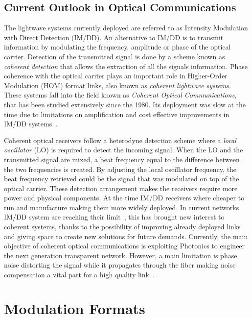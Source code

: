 \subsection{Current Outlook in Optical Communications}


The lightwave systems currently deployed are referred to as Intensity Modulation with Direct Detection (IM/DD). An alternative to IM/DD is to transmit information by modulating the frequency, amplitude or  phase of the optical carrier. Detection of the transmitted signal is done by a scheme known as \textit{coherent detection} that allows the extraction of all the signals information. Phase coherence with the optical carrier plays an important role in Higher-Order Modulation (HOM) format links, also known as \textit{coherent lightwave systems}. These systems fall into the field known as  \textit{Coherent Optical Communications}, that has been studied extensively since the 1980. Its deployment was slow at the time due to limitations on amplification and cost effective improvements in IM/DD systems~\cite{FiberAgrawal,NetGenTransp}.

 Coherent optical receivers follow a heterodyne detection scheme where a \textit{local oscillator} (LO) is required to detect the incoming signal.
When the LO and the transmitted signal are mixed, a beat frequency equal to the difference between the two frequencies is created. By adjusting the local oscillator frequency, the beat frequency retrieved could be the signal that was modulated on top of the optical carrier. These detection arrangement makes the receivers require more power and physical components. At the time IM/DD receivers where cheaper to run and manufacture making them more widely deployed. In current networks IM/DD system are reaching their limit~\cite{COChistory}, this has brought new interest to coherent systems, thanks to the possibility of improving already deployed links and giving space to create new solutions for future demands. Currently, the main objective of coherent optical communications is exploiting Photonics to engineer the next generation transparent network. However, a main limitation is phase noise distorting the signal while it propagates through the fiber making noise compensation a vital part for a high quality link~\cite{behrens2010nonlinear}.

\section{ Modulation Formats }\label{sec:modform}
 
